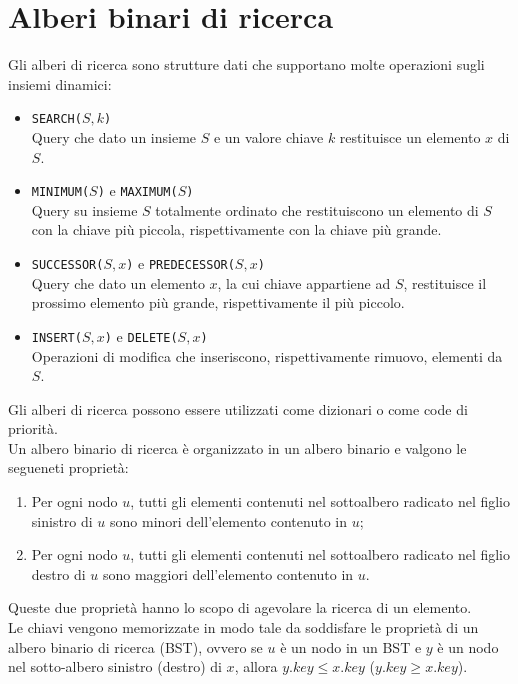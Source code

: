 \documentclass[12pt]{report}
\begin{document}
  	\chapter{Alberi binari di ricerca}
  	Gli alberi di ricerca sono strutture dati che supportano molte operazioni sugli insiemi dinamici:
  	\begin{itemize}
  		\item \texttt{SEARCH($S, k$)} \\
  		\quad Query che dato un insieme $S$ e un valore chiave $k$ restituisce un elemento $x$ di $S$.
  		\item \texttt{MINIMUM($S$)} e \texttt{MAXIMUM($S$)} \\
  		\quad Query su insieme $S$ totalmente ordinato che restituiscono un elemento di $S$ con la chiave più piccola, rispettivamente con la chiave più grande.
  		\item \texttt{SUCCESSOR($S, x$)} e \texttt{PREDECESSOR($S, x$)} \\
  		\quad Query che dato un elemento $x$, la cui chiave appartiene ad $S$, restituisce il prossimo elemento più grande, rispettivamente il più piccolo.
  		\item \texttt{INSERT($S, x$)} e \texttt{DELETE($S, x$)} \\
  		\quad Operazioni di modifica che inseriscono, rispettivamente rimuovo, elementi da $S$.
  	\end{itemize}
  	Gli alberi di ricerca possono essere utilizzati come dizionari o come code di priorità. \\
  	Un albero binario di ricerca è organizzato in un albero binario e valgono le segueneti proprietà:
  	\begin{enumerate}
  		\item Per ogni nodo $u$, tutti gli elementi contenuti nel sottoalbero radicato nel figlio sinistro di $u$ sono minori dell'elemento contenuto in $u$;
  		\item Per ogni nodo $u$, tutti gli elementi contenuti nel sottoalbero radicato nel figlio destro di $u$ sono maggiori dell'elemento contenuto in $u$.
  	\end{enumerate}
  	Queste due proprietà hanno lo scopo di agevolare la ricerca di un elemento. \\
  	Le chiavi vengono memorizzate in modo tale da soddisfare le proprietà di un albero binario di ricerca (BST), ovvero se $u$ è un nodo in un BST e $y$ è un nodo nel sotto-albero sinistro (destro) di $x$, allora $y.key \leq x.key$ ($y.key \geq x.key$). \\
\end{document}

